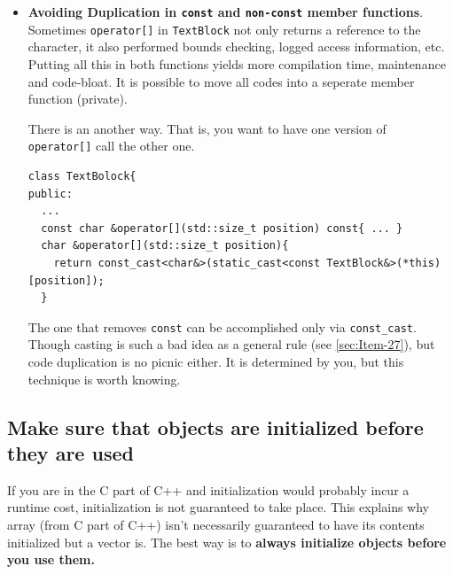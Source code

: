 \begin{itemize}
\item \textbf{Avoiding Duplication in \texttt{const} and
    \texttt{non-const} member functions}. Sometimes
  \texttt{operator[]} in \texttt{TextBlock} not only returns a
  reference to the character, it also performed bounds checking,
  logged access information, etc. Putting all this in both functions
  yields more compilation time, maintenance and code-bloat. It is
  possible to move all codes into a seperate member function
  (private).

  There is an another way. That is, you want to have one version of
  \texttt{operator[]} call the other one.
\begin{verbatim}
class TextBolock{
public:
  ...
  const char &operator[](std::size_t position) const{ ... }
  char &operator[](std::size_t position){
    return const_cast<char&>(static_cast<const TextBlock&>(*this)[position]);
  }
\end{verbatim}
  The one that removes \texttt{const} can be accomplished only via
  \texttt{const\_cast}. Though casting is such a bad idea as a general
  rule (see \ref{sec:Item-27}), but code duplication is no picnic
  either. It is determined by you, but this technique is worth knowing.
\end{itemize}

\subsection{Make sure that objects are initialized before they are used}
\label{sec:Item-4}

If you are in the C part of C++ and initialization would probably
incur a runtime cost, initialization is not guaranteed to take
place. This explains why array (from C part of C++) isn't necessarily
guaranteed to have its contents initialized but a vector is.
The best way is to \textbf{always initialize objects before you use
  them.}


